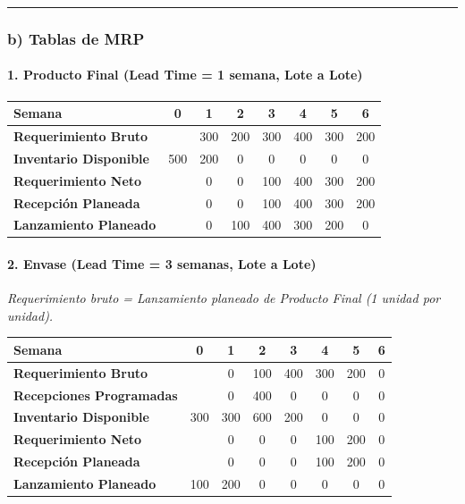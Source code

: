 \documentclass[
]{article}
\begin{document}
\begin{center}\rule{0.5\linewidth}{0.5pt}\end{center}

\hypertarget{b-tablas-de-mrp}{%
\subsubsection{b) Tablas de MRP}\label{b-tablas-de-mrp}}

\hypertarget{producto-final-lead-time-1-semana-lote-a-lote}{%
\paragraph{1. Producto Final (Lead Time = 1 semana, Lote a
Lote)}\label{producto-final-lead-time-1-semana-lote-a-lote}}

\begin{longtable}[]{@{}lccccccc@{}}
\toprule\noalign{}
Semana & 0 & 1 & 2 & 3 & 4 & 5 & 6 \\
\midrule\noalign{}
\endhead
\bottomrule\noalign{}
\endlastfoot
\textbf{Requerimiento Bruto} & & 300 & 200 & 300 & 400 & 300 & 200 \\
\textbf{Inventario Disponible} & 500 & 200 & 0 & 0 & 0 & 0 & 0 \\
\textbf{Requerimiento Neto} & & 0 & 0 & 100 & 400 & 300 & 200 \\
\textbf{Recepción Planeada} & & 0 & 0 & 100 & 400 & 300 & 200 \\
\textbf{Lanzamiento Planeado} & & 0 & 100 & 400 & 300 & 200 & 0 \\
\end{longtable}

\hypertarget{envase-lead-time-3-semanas-lote-a-lote}{%
\paragraph{2. Envase (Lead Time = 3 semanas, Lote a
Lote)}\label{envase-lead-time-3-semanas-lote-a-lote}}

\emph{Requerimiento bruto = Lanzamiento planeado de Producto Final (1
unidad por unidad).}

\begin{longtable}[]{@{}lccccccc@{}}
\toprule\noalign{}
Semana & 0 & 1 & 2 & 3 & 4 & 5 & 6 \\
\midrule\noalign{}
\endhead
\bottomrule\noalign{}
\endlastfoot
\textbf{Requerimiento Bruto} & & 0 & 100 & 400 & 300 & 200 & 0 \\
\textbf{Recepciones Programadas} & & 0 & 400 & 0 & 0 & 0 & 0 \\
\textbf{Inventario Disponible} & 300 & 300 & 600 & 200 & 0 & 0 & 0 \\
\textbf{Requerimiento Neto} & & 0 & 0 & 0 & 100 & 200 & 0 \\
\textbf{Recepción Planeada} & & 0 & 0 & 0 & 100 & 200 & 0 \\
\textbf{Lanzamiento Planeado} & 100 & 200 & 0 & 0 & 0 & 0 & 0 \\
\end{longtable}
\end{document}

